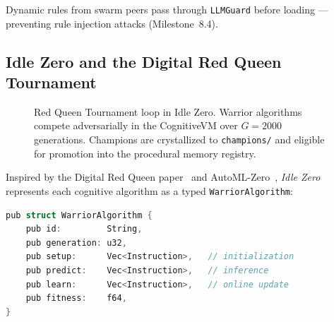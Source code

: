 \documentclass[12pt,a4paper]{article}
\begin{document}
Dynamic rules from swarm peers pass through \texttt{LLMGuard} before loading --- preventing rule
injection attacks (Milestone~8.4).

\subsection{Idle Zero and the Digital Red Queen Tournament}
\label{sec:redqueen}

\begin{figure}[H]
\centering
{}
\caption{Red Queen Tournament loop in Idle Zero. Warrior algorithms compete adversarially in the
CognitiveVM over $G=2000$ generations. Champions are crystallized to \texttt{champions/} and
eligible for promotion into the procedural memory registry.}
\label{fig:redqueen}
\end{figure}

Inspired by the Digital Red Queen paper~\cite{kumar2025redqueen} and AutoML-Zero~\cite{real2020automlzero},
\emph{Idle Zero} represents each cognitive algorithm as a typed \texttt{WarriorAlgorithm}:

\begin{lstlisting}[language=C, caption={WarriorAlgorithm data structure (Rust)}]
pub struct WarriorAlgorithm {
    pub id:         String,
    pub generation: u32,
    pub setup:      Vec<Instruction>,   // initialization
    pub predict:    Vec<Instruction>,   // inference
    pub learn:      Vec<Instruction>,   // online update
    pub fitness:    f64,
}
\end{lstlisting}
\end{document}
